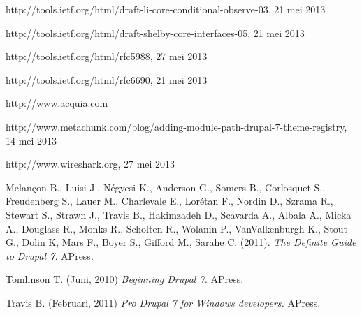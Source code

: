 \begin{thebibliography}{99}
 http://tools.ietf.org/html/draft-li-core-conditional-observe-03, 21 mei 2013

 http://tools.ietf.org/html/draft-shelby-core-interfaces-05, 21 mei 2013

 http://tools.ietf.org/html/rfc5988, 27 mei 2013

 http://tools.ietf.org/html/rfc6690, 21 mei 2013

 http://www.acquia.com

 http://www.metachunk.com/blog/adding-module-path-drupal-7-theme-registry, 14 mei 2013

 http://www.wireshark.org, 27 mei 2013

 Melançon B., Luisi J., Négyesi K., Anderson G., Somers B., Corlosquet S., Freudenberg S., Lauer M., Charlevale E., Lorétan F., Nordin D., Szrama R., Stewart S., Strawn J., Travis B., Hakimzadeh D., Scavarda A., Albala A., Micka A., Douglass R., Monks R., Scholten R., Wolanin P., VanValkenburgh K., Stout G., Dolin K, Mars F., Boyer S., Gifford M., Sarahe C. (2011). {\em The Definite Guide to Drupal 7.} APress.

 Tomlinson T. (Juni, 2010) {\em Beginning Drupal 7.} APress.

 Travis B. (Februari, 2011) {\em Pro Drupal 7 for Windows developers.} APress.

\end{thebibliography}

